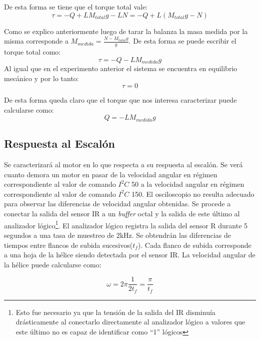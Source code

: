 \documentclass[main]{subfiles}
\begin{document}
De esta forma se tiene que el torque total vale:
\begin{equation}
\tau = -Q+LM_{total}g-LN=-Q+L(M_{total}g-N)
\end{equation}

Como se explico anteriormente luego de tarar la balanza la masa medida por la misma corresponde a $M_{medida}=\frac{N-M_{total}g}{g} $. De esta forma se puede escribir el torque total como:
\begin{equation}
\tau=-Q-LM_{medida}g
\end{equation}
Al igual que en el experimento anterior el sistema se encuentra en equilibrio mec\'anico y por lo tanto: 
\begin{equation}
\tau=0
\end{equation}

De esta forma queda claro que el torque que nos interesa caracterizar puede calcularse como:
\begin{equation}
Q=-LM_{medida}g
\end{equation}

\subsection{Respuesta al Escal\'on}
Se caracterizar\'a al motor en lo que respecta a su respuesta al escal\'on. Se ver\'a cuanto demora un motor en pasar de la velocidad angular en r\'egimen correspondiente al valor de comando $I^2C$ 50 a la velocidad angular en r\'egimen correspondiente al valor de comando $I^2C$ 150. El osciloscopio no resulta adecuado para observar las diferencias de velocidad angular obtenidas. Se procede a conectar la salida del sensor IR a un \emph{buffer} octal y la salida de este \'ultimo al analizador l\'ogico\footnote{ Esto fue necesario ya que la tensi\'on de la salida del IR disminu\'ia dr\'asticamente al conectarlo directamente al analizador l\'ogico a valores que este \'ultimo no es capaz de identificar como ``1'' l\'ogicos}. El analizador l\'ogico registra la salida del sensor R durante 5 segundos a una tasa de muestreo de 2kHz. Se obtendr\'an las diferencias de tiempos entre flancos de subida sucesivos($t_f$). Cada flanco de subida corresponde a una hoja de la h\'elice siendo detectada por el sensor IR. La velocidad angular de la h\'elice puede calcularse como:

\begin{equation}
\omega = 2 \pi \frac{1}{2t_f} = \frac{\pi}{t_f}
\end{equation}
 
\end{document}
